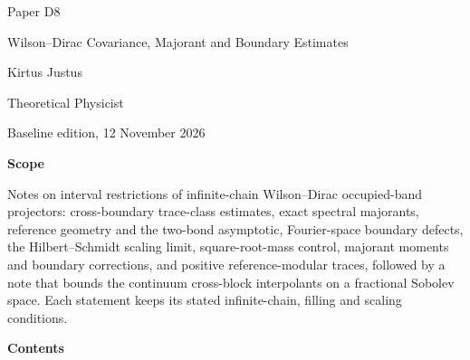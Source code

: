 \documentclass[11pt,a4paper]{article}
\begin{document}
\thispagestyle{empty}\pagestyle{empty}
{\small\sffamily \ProgramTitle\hfill Paper D8\par}
\vspace*{12mm}
{\LARGE\bfseries\raggedright{} Wilson–Dirac Covariance, Majorant and Boundary Estimates\par}
\vspace{9mm}
{\large Kirtus Justus\par}\vspace{1mm}Theoretical Physicist\par\AuthorLocation\par\vspace{2mm}Baseline edition, 12 November 2026\par\vspace{8mm}
\textbf{Scope}\par
Notes on interval restrictions of infinite-chain Wilson–Dirac occupied-band projectors: cross-boundary trace-class estimates, exact spectral majorants, reference geometry and the two-bond asymptotic, Fourier-space boundary defects, the Hilbert–Schmidt scaling limit, square-root-mass control, majorant moments and boundary corrections, and positive reference-modular traces, followed by a note that bounds the continuum cross-block interpolants on a fractional Sobolev space. Each statement keeps its stated infinite-chain, filling and scaling conditions.\par\vspace{5mm}
\textbf{Contents}\par\vspace{1mm}
\end{document}
